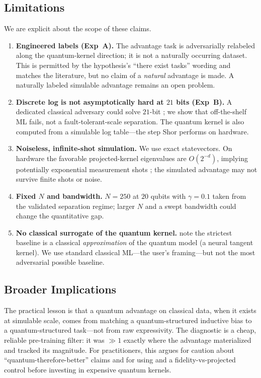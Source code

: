 \subsection{Limitations}
\label{sec:limitations}

We are explicit about the scope of these claims.
\begin{enumerate}[leftmargin=*,itemsep=1pt,topsep=2pt]
    \item \textbf{Engineered labels (Exp~A).} The advantage task is adversarially
    relabeled along the quantum-kernel direction; it is not a naturally occurring
    dataset. This is permitted by the hypothesis's ``there exist tasks'' wording
    and matches the literature, but no claim of a \emph{natural} advantage is made.
    A naturally labeled simulable advantage remains an open problem.
    \item \textbf{Discrete log is not asymptotically hard at $21$ bits (Exp~B).} A
    dedicated classical adversary could solve $21$-bit \dlp{}; we show that
    off-the-shelf ML fails, not a fault-tolerant-scale separation. The quantum
    kernel is also computed from a simulable log table---the step Shor performs on
    hardware.
    \item \textbf{Noiseless, infinite-shot simulation.} We use exact statevectors.
    On hardware the favorable projected-kernel eigenvalues are $O(2^{-d})$,
    implying potentially exponential measurement shots
    \citep{kubler2021inductive}; the simulated advantage may not survive finite
    shots or noise.
    \item \textbf{Fixed $N$ and bandwidth.} $N=250$ at $20$ qubits with
    $\gamma=0.1$ taken from the validated separation regime; larger $N$ and a swept
    bandwidth could change the quantitative gap.
    \item \textbf{No classical surrogate of the quantum kernel.}
    \citet{huang2021power} note the strictest baseline is a classical
    \emph{approximation} of the quantum model (\eg a neural tangent kernel). We use
    standard classical ML---the user's framing---but not the most adversarial
    possible baseline.
\end{enumerate}

\subsection{Broader Implications}

The practical lesson is that a quantum advantage on classical data, when it
exists at simulable scale, comes from matching a quantum-structured inductive bias
to a quantum-structured task---not from raw expressivity. The \gdiff{} diagnostic
is a cheap, reliable pre-training filter: it was $\gg 1$ exactly where the
advantage materialized and tracked its magnitude. For practitioners, this argues
for caution about ``quantum-therefore-better'' claims and for using \gdiff{} and a
fidelity-vs-projected control before investing in expensive quantum kernels.
